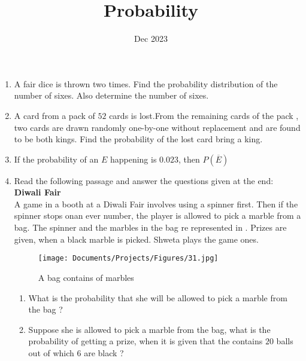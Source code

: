 \documentclass[12pt,-letter paper]{article}
\title{Probability}
\date{Dec 2023}
\begin{document}
\maketitle
\begin{enumerate}

\item A fair dice is thrown two times. Find the probability distribution of the number of sixes. Also determine the number of sixes.

\item A card from a pack of $52$ cards is lost.From the remaining cards of the pack , two cards are drawn randomly one-by-one without replacement and are found to be both kings. Find the probability of the lost card bring a king.

\item If the probability of an $E$ happening is $0.023$, then $P(\overline{E})$

\item Read the following passage and answer the questions given at the end:\\
\textbf{Diwali Fair}\\
		A game in a booth at a Diwali Fair involves using a spinner first. Then if the spinner stops onan ever number, the player is allowed to pick a marble from a bag. The spinner and the marbles in the bag re represented in .
Prizes are given, when a black marble is picked. Shweta plays the game ones.
		\begin{figure}[H]
			\centering
			\texttt{[image: Documents/Projects/Figures/31.jpg]}
			\caption{A bag contains of marbles}
			\label{fig:31.jpg}
		\end{figure}
\begin{enumerate}
	\item What is the probability that she will be allowed to pick a marble from the bag ?

	\item Suppose she is allowed to pick a marble from the bag, what is the probability of getting a prize, when it is given that the contains $20$ balls out of which $6$ are black ?
\end{enumerate}
\end{enumerate}
\end{document}
